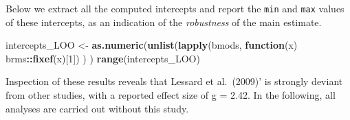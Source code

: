 \documentclass[floatsintext,doc]{apa6}
\newenvironment{Shaded}{\begin{snugshade}}{\end{snugshade}}
\newcommand{\ControlFlowTok}[1]{\textcolor[rgb]{0.13,0.29,0.53}{\textbf{#1}}}
\newcommand{\DataTypeTok}[1]{\textcolor[rgb]{0.13,0.29,0.53}{#1}}
\newcommand{\DecValTok}[1]{\textcolor[rgb]{0.00,0.00,0.81}{#1}}
\newcommand{\KeywordTok}[1]{\textcolor[rgb]{0.13,0.29,0.53}{\textbf{#1}}}
\newcommand{\NormalTok}[1]{#1}
\newcommand{\OperatorTok}[1]{\textcolor[rgb]{0.81,0.36,0.00}{\textbf{#1}}}
\newcommand{\StringTok}[1]{\textcolor[rgb]{0.31,0.60,0.02}{#1}}
\begin{document}
\begin{Shaded}
\end{Shaded}

Below we extract all the computed intercepts and report the \texttt{min} and \texttt{max} values of these intercepts, as an indication of the \emph{robustness} of the main estimate.

\begin{Shaded}
\begin{Highlighting}[]
\NormalTok{intercepts_LOO <-}\StringTok{ }\KeywordTok{as.numeric}\NormalTok{(}\KeywordTok{unlist}\NormalTok{(}\KeywordTok{lapply}\NormalTok{(bmods, }\ControlFlowTok{function}\NormalTok{(x) brms}\OperatorTok{::}\KeywordTok{fixef}\NormalTok{(x)[}\DecValTok{1}\NormalTok{]) ) )}
\KeywordTok{range}\NormalTok{(intercepts_LOO)}
\end{Highlighting}
\end{Shaded}

Inspection of these results reveals that Lessard et al.~(2009)' is strongly deviant from other studies, with a reported effect size of g = 2.42. In the following, all analyses are carried out without this study.
\end{document}
